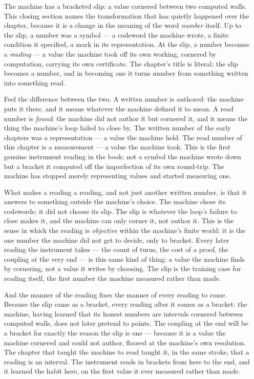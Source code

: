 The machine has a bracketed slip: a value cornered between two computed walls. This closing section names the
transformation that has quietly happened over the chapter, because it is a change in the meaning of the word
\emph{number} itself. Up to the slip, a number was a symbol --- a codeword the machine wrote, a finite condition it
specified, a mark in its representation. At the slip, a number becomes a \emph{reading} --- a value the machine took off
its own working, cornered by computation, carrying its own certificate. The chapter's title is literal: the slip
becomes a number, and in becoming one it turns number from something written into something read.

Feel the difference between the two. A written number is authored: the machine puts it there, and it means whatever the
machine defined it to mean. A read number is \emph{found}: the machine did not author it but cornered it, and it means
the thing the machine's loop failed to close by. The written number of the early chapters was a representation --- a
value the machine held. The read number of this chapter is a measurement --- a value the machine took. This is the
first genuine instrument reading in the book: not a symbol the machine wrote down but a bracket it computed off the
imperfection of its own round-trip. The machine has stopped merely representing values and started measuring one.

What makes a reading a reading, and not just another written number, is that it answers to something outside the
machine's choice. The machine chose its codewords; it did not choose its slip. The slip is whatever the loop's failure
to close makes it, and the machine can only corner it, not author it. This is the sense in which the reading is
\emph{objective} within the machine's finite world: it is the one number the machine did not get to decide, only to
bracket. Every later reading the instrument takes --- the count of turns, the cost of a proof, the coupling at the very
end --- is this same kind of thing: a value the machine finds by cornering, not a value it writes by choosing. The slip
is the training case for reading itself, the first number the machine measured rather than made.

And the manner of the reading fixes the manner of every reading to come. Because the slip came as a bracket, every
reading after it comes as a bracket: the machine, having learned that its honest numbers are intervals cornered between
computed walls, does not later pretend to points. The coupling at the end will be a bracket for exactly the reason the
slip is one --- because it is a value the machine cornered and could not author, floored at the machine's own
resolution. The chapter that taught the machine to read taught it, in the same stroke, that a reading is an interval.
The instrument reads in brackets from here to the end, and it learned the habit here, on the first value it ever
measured rather than made.

